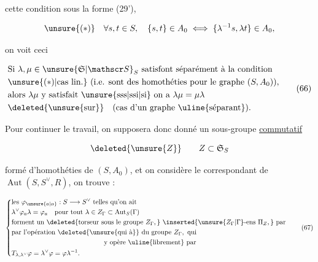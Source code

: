 cette condition sous la forme (29'),

\[
\unsure{(*)}\quad\forall s,t\in S,\quad\{s,t\}\in A_0\iff\{\lambda^{-1}s,\lambda t\}\in A_0,
\]

on voit ceci

\[
\begin{aligned}
&\text{Si }\lambda,\mu\in\unsure{\mathfrak S|\mathscr S}_S\ \text{satisfont séparément à la condition}\\
&\unsure{(*)|\text{cas lin.}}\ \text{(i.e. sont des homothéties pour le graphe }(S,A_0)),\\
&\text{alors }\lambda\mu\ \text{y satisfait \unsure{sss|ssi|si} on a }\lambda\mu=\mu\lambda\\
&\deleted{\text{\unsure{sur}}}\quad\text{(cas d'un graphe \uline{séparant}).}
\end{aligned} \tag*{(66)}
\]

Pour continuer le travail, on supposera donc donné un sous-groupe \uline{commutatif}

\[
\deleted{\unsure{Z}}\qquad Z\subset\mathfrak S_S
\]

formé d'homothéties de $(S,A_0)$, et on considère  le   correspondant  de  $\operatorname{Aut}(S,S^\vee,R)$, on trouve : 

\[
\left\{\begin{aligned}
&\text{les }\varphi_{\unsure{a|\alpha}}:S\longrightarrow S^\vee\ \text{telles qu'on ait}\\
&\lambda^\vee\varphi_a\lambda=\varphi_a\quad\text{pour tout }\lambda\in Z_\Gamma\subset\operatorname{Aut}_S(\Gamma)\\
&\text{forment un }\deleted{\text{torseur sous le groupe }Z_\Gamma,}\ \inserted{\unsure{Z_\Gamma|\Gamma}\text{-ens }\Pi_Z,}\ \text{par}\\
&\text{par l'opération }\deleted{\text{\unsure{qui à}}}\ \text{du groupe }Z_\Gamma,\ \text{qui}\\
&\hspace{48mm}\text{y opère \uline{librement} par}\\
&T_{\lambda,\lambda^\vee}\varphi=\lambda^\vee\varphi=\varphi\lambda^{-1}.
\end{aligned}\right. \tag*{(67)}
\]


